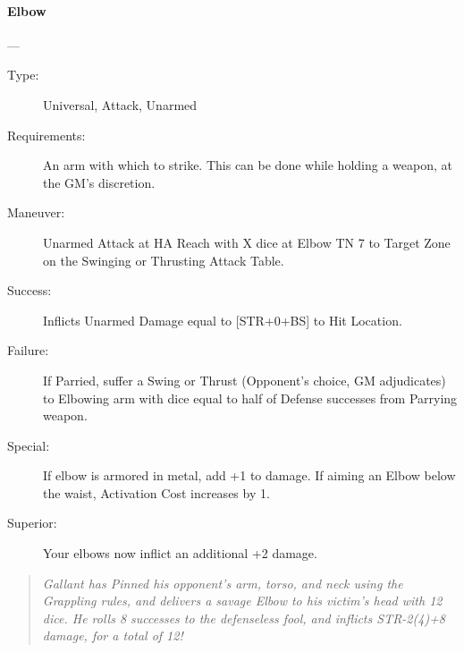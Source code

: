 \documentclass[oneside,11pt,english]{book}
\begin{document}
\paragraph{\large\label{man:Elbow}Elbow}---\quad{\large[X]}
\vspace{-10pt}\begin{description} 
\item [Type:] Universal, Attack, Unarmed 
\item [Requirements:] An arm with which to strike. This can be done while holding a weapon, at the GM's 
  discretion. 
\item [Maneuver:] Unarmed Attack at HA Reach with X dice at Elbow TN 7 to Target Zone on the Swinging or 
  Thrusting Attack Table. 
\item [Success:] Inflicts Unarmed Damage equal to [STR+0+BS] to Hit Location. 
\item [Failure:] If Parried, suffer a Swing or Thrust (Opponent’s choice, GM adjudicates) to Elbowing arm with 
  dice equal to half of Defense successes from Parrying weapon. 
\item [Special:] If elbow is armored in metal, add +1 to damage. 
  If aiming an Elbow below the waist, Activation Cost increases by 1. 
\item [Superior:] Your elbows now inflict an additional +2 damage. 
\end{description}
\begin{quotation}
  \emph{Gallant has Pinned his opponent’s arm, torso, and neck using the
    Grappling rules, and delivers a savage Elbow to his victim’s head with 12
    dice. He rolls 8 successes to the defenseless fool, and inflicts STR-2(4)+8
    damage, for a total of 12! } 
\end{quotation}
\end{document}
